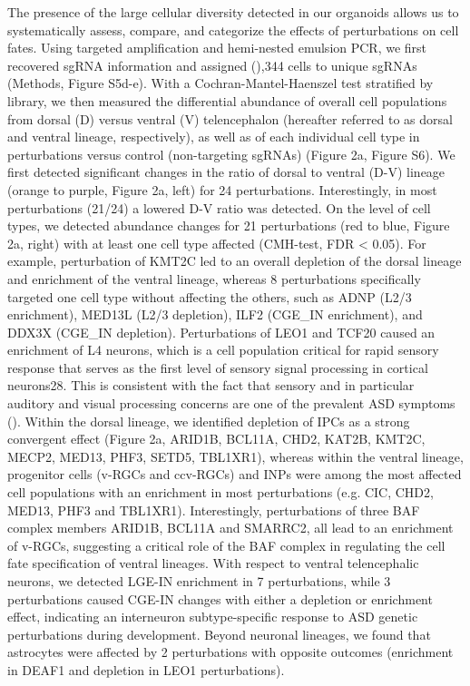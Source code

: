 The presence of the large cellular diversity detected in our organoids allows us to systematically assess, compare, and categorize the effects of perturbations on cell fates. Using targeted amplification and hemi-nested emulsion PCR, we first recovered sgRNA information and assigned (\cite{harris_neocortical_2015}),344 cells to unique sgRNAs (Methods, Figure S5d-e). With a Cochran-Mantel-Haenszel test stratified by library, we then measured the differential abundance of overall cell populations from dorsal (D) versus ventral (V) telencephalon (hereafter referred to as dorsal and ventral lineage, respectively), as well as of each individual cell type in perturbations versus control (non-targeting sgRNAs) (Figure 2a, Figure S6). 
We first detected significant changes in the ratio of dorsal to ventral (D-V) lineage (orange to purple, Figure 2a, left) for 24 perturbations. Interestingly, in most perturbations (21/24) a lowered D-V ratio was detected. On the level of cell types, we detected abundance changes for 21 perturbations (red to blue, Figure 2a, right) with at least one cell type affected (CMH-test, FDR < 0.05). For example, perturbation of KMT2C led to an overall depletion of the dorsal lineage and enrichment of the ventral lineage, whereas 8 perturbations specifically targeted one cell type without affecting the others, such as ADNP (L2/3 enrichment), MED13L (L2/3 depletion), ILF2 (CGE\_IN enrichment), and DDX3X (CGE\_IN depletion). Perturbations of LEO1 and TCF20 caused an enrichment of L4 neurons, which is a cell population critical for rapid sensory response that serves as the first level of sensory signal processing in cortical neurons28. This is consistent with the fact that sensory and in particular auditory and visual processing concerns are one of the prevalent ASD symptoms (\cite{marco_sensory_2011}). 
Within the dorsal lineage, we identified depletion of IPCs as a strong convergent effect (Figure 2a, ARID1B, BCL11A, CHD2, KAT2B, KMT2C, MECP2, MED13, PHF3, SETD5, TBL1XR1), whereas within the ventral lineage, progenitor cells (v-RGCs and ccv-RGCs) and INPs were among the most affected cell populations with an enrichment in most perturbations (e.g. CIC, CHD2, MED13, PHF3 and TBL1XR1). Interestingly, perturbations of three BAF complex members ARID1B, BCL11A and SMARRC2, all lead to an enrichment of v-RGCs, suggesting a critical role of the BAF complex in regulating the cell fate specification of ventral lineages. With respect to ventral telencephalic neurons, we detected LGE-IN enrichment in 7 perturbations, while 3 perturbations caused CGE-IN changes with either a depletion or enrichment effect, indicating an interneuron subtype-specific response to ASD genetic perturbations during development. Beyond neuronal lineages, we found that astrocytes were affected by 2 perturbations with opposite outcomes (enrichment in DEAF1 and depletion in LEO1 perturbations). 

